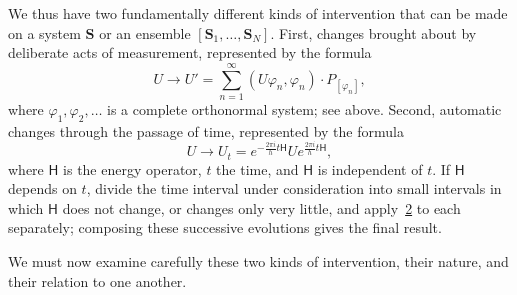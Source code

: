 \documentclass[fontsize=13pt,twoside,openany,headings=normal,parskip=false,bookmarkpackage=false,DIV=calc]{scrbook}
\begin{document}
We thus have two fundamentally different kinds of intervention that can be made on a system $\boldsymbol{S}$ or an ensemble $[\boldsymbol{S}_1,\ldots,\boldsymbol{S}_N]$. First, changes brought about by deliberate acts of measurement, represented by the formula
\begin{equation}\tag{1}\label{eq:V.1.1}
U\longrightarrow U'=\sum_{n=1}^{\infty}(U\varphi_n,\varphi_n)\cdot P_{[\varphi_n]},
\end{equation}
where $\varphi_1,\varphi_2,\ldots$ is a complete orthonormal system; see above. Second, automatic changes through the passage of time, represented by the formula
\begin{equation}\tag{2}\label{eq:V.1.2}
U\longrightarrow U_t=e^{-\frac{2\pi i}{h}t\mathsf{H}}Ue^{\frac{2\pi i}{h}t\mathsf{H}},
\end{equation}
\hypertarget{origpage-187}{}%
where $\mathsf{H}$ is the energy operator, $t$ the time, and $\mathsf{H}$ is independent of $t$. If $\mathsf{H}$ depends on $t$, divide the time interval under consideration into small intervals in which $\mathsf{H}$ does not change, or changes only very little, and apply~\hyperref[eq:V.1.2]{2} to each separately; composing these successive evolutions gives the final result.

We must now examine carefully these two kinds of intervention, their nature, and their relation to one another.
\end{document}
